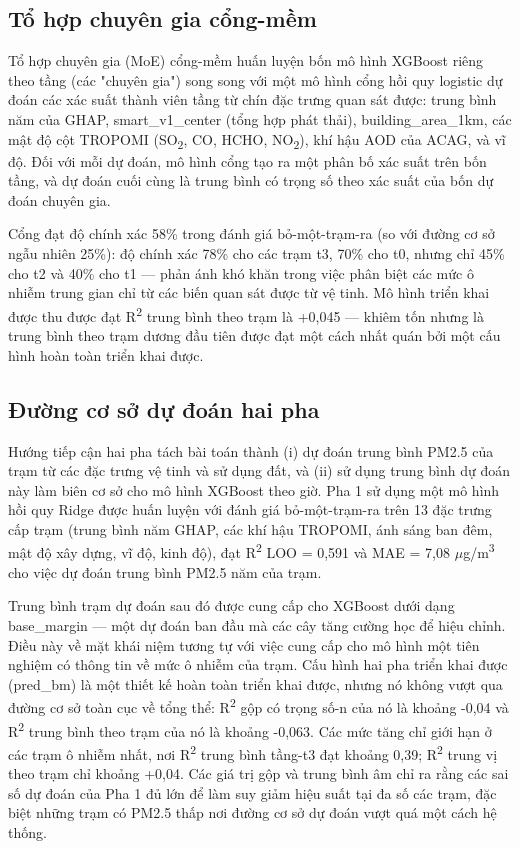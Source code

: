 \subsection{Tổ hợp chuyên gia cổng-mềm}

Tổ hợp chuyên gia (MoE) cổng-mềm huấn luyện bốn mô hình XGBoost riêng theo tầng (các "chuyên gia") song song với một mô hình cổng hồi quy logistic dự đoán các xác suất thành viên tầng từ chín đặc trưng quan sát được: trung bình năm của GHAP, smart\_v1\_center (tổng hợp phát thải), building\_area\_1km, các mật độ cột TROPOMI (SO\textsubscript{2}, CO, HCHO, NO\textsubscript{2}), khí hậu AOD của ACAG, và vĩ độ. Đối với mỗi dự đoán, mô hình cổng tạo ra một phân bố xác suất trên bốn tầng, và dự đoán cuối cùng là trung bình có trọng số theo xác suất của bốn dự đoán chuyên gia.

Cổng đạt độ chính xác 58\% trong đánh giá bỏ-một-trạm-ra (so với đường cơ sở ngẫu nhiên 25\%): độ chính xác 78\% cho các trạm t3, 70\% cho t0, nhưng chỉ 45\% cho t2 và 40\% cho t1 --- phản ánh khó khăn trong việc phân biệt các mức ô nhiễm trung gian chỉ từ các biến quan sát được từ vệ tinh. Mô hình triển khai được thu được đạt R\textsuperscript{2} trung bình theo trạm là +0,045 --- khiêm tốn nhưng là trung bình theo trạm dương đầu tiên được đạt một cách nhất quán bởi một cấu hình hoàn toàn triển khai được.

\subsection{Đường cơ sở dự đoán hai pha}

Hướng tiếp cận hai pha tách bài toán thành (i) dự đoán trung bình PM2.5 của trạm từ các đặc trưng vệ tinh và sử dụng đất, và (ii) sử dụng trung bình dự đoán này làm biên cơ sở cho mô hình XGBoost theo giờ. Pha 1 sử dụng một mô hình hồi quy Ridge được huấn luyện với đánh giá bỏ-một-trạm-ra trên 13 đặc trưng cấp trạm (trung bình năm GHAP, các khí hậu TROPOMI, ánh sáng ban đêm, mật độ xây dựng, vĩ độ, kinh độ), đạt R\textsuperscript{2} LOO = 0,591 và MAE = 7,08 $\mu$g/m\textsuperscript{3} cho việc dự đoán trung bình PM2.5 năm của trạm.

Trung bình trạm dự đoán sau đó được cung cấp cho XGBoost dưới dạng base\_margin --- một dự đoán ban đầu mà các cây tăng cường học để hiệu chỉnh. Điều này về mặt khái niệm tương tự với việc cung cấp cho mô hình một tiên nghiệm có thông tin về mức ô nhiễm của trạm. Cấu hình hai pha triển khai được (pred\_bm) là một thiết kế hoàn toàn triển khai được, nhưng nó không vượt qua đường cơ sở toàn cục về tổng thể: R\textsuperscript{2} gộp có trọng số-n của nó là khoảng -0,04 và R\textsuperscript{2} trung bình theo trạm của nó là khoảng -0,063. Các mức tăng chỉ giới hạn ở các trạm ô nhiễm nhất, nơi R\textsuperscript{2} trung bình tầng-t3 đạt khoảng 0,39; R\textsuperscript{2} trung vị theo trạm chỉ khoảng +0,04. Các giá trị gộp và trung bình âm chỉ ra rằng các sai số dự đoán của Pha 1 đủ lớn để làm suy giảm hiệu suất tại đa số các trạm, đặc biệt những trạm có PM2.5 thấp nơi đường cơ sở dự đoán vượt quá một cách hệ thống.

